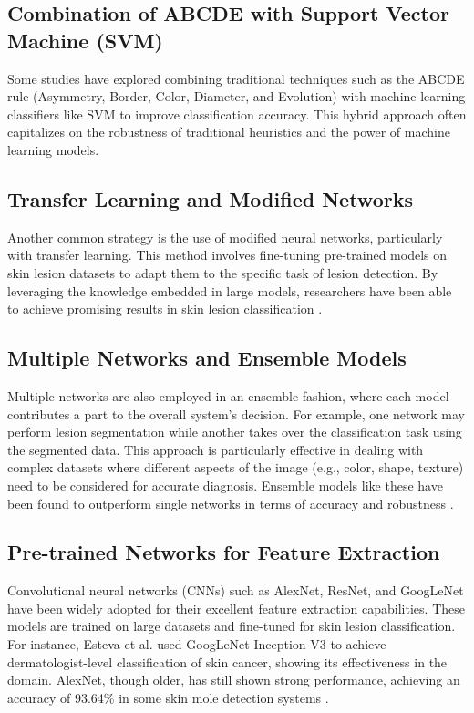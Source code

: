 \documentclass{article}
\begin{document}
\subsection{Combination of ABCDE with Support Vector Machine (SVM)}
Some studies have explored combining traditional techniques such as the ABCDE rule (Asymmetry, Border, Color, Diameter, and Evolution) with machine learning classifiers like SVM to improve classification accuracy. This hybrid approach often capitalizes on the robustness of traditional heuristics and the power of machine learning models.

\subsection{Transfer Learning and Modified Networks}
Another common strategy is the use of modified neural networks, particularly with transfer learning. This method involves fine-tuning pre-trained models on skin lesion datasets to adapt them to the specific task of lesion detection. By leveraging the knowledge embedded in large models, researchers have been able to achieve promising results in skin lesion classification \cite{Popescu2022}.

\subsection{Multiple Networks and Ensemble Models}
Multiple networks are also employed in an ensemble fashion, where each model contributes a part to the overall system's decision. For example, one network may perform lesion segmentation while another takes over the classification task using the segmented data. This approach is particularly effective in dealing with complex datasets where different aspects of the image (e.g., color, shape, texture) need to be considered for accurate diagnosis. Ensemble models like these have been found to outperform single networks in terms of accuracy and robustness \cite{Esteva2017, Akram2020}.

\subsection{Pre-trained Networks for Feature Extraction}
Convolutional neural networks (CNNs) such as AlexNet, ResNet, and GoogLeNet have been widely adopted for their excellent feature extraction capabilities. These models are trained on large datasets and fine-tuned for skin lesion classification. For instance, Esteva et al. \cite{Esteva2017} used GoogLeNet Inception-V3 to achieve dermatologist-level classification of skin cancer, showing its effectiveness in the domain. AlexNet, though older, has still shown strong performance, achieving an accuracy of 93.64\% in some skin mole detection systems \cite{Pomponiu2016}.
\end{document}
